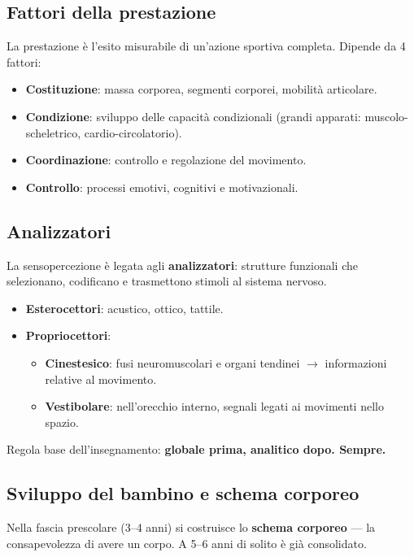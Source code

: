 \documentclass[12pt, a4paper]{article}
\begin{document}
\subsection{Fattori della prestazione}

La prestazione è l'esito misurabile di un'azione sportiva completa. Dipende da 4 fattori:
\begin{itemize}
  \item \textbf{Costituzione}: massa corporea, segmenti corporei, mobilità articolare.
  \item \textbf{Condizione}: sviluppo delle capacità condizionali (grandi apparati: muscolo-scheletrico, cardio-circolatorio).
  \item \textbf{Coordinazione}: controllo e regolazione del movimento.
  \item \textbf{Controllo}: processi emotivi, cognitivi e motivazionali.
\end{itemize}

\subsection{Analizzatori}

La sensopercezione è legata agli \textbf{analizzatori}: strutture funzionali che selezionano, codificano e trasmettono stimoli al sistema nervoso.

\begin{itemize}
  \item \textbf{Esterocettori}: acustico, ottico, tattile.
  \item \textbf{Propriocettori}:
  \begin{itemize}
    \item \textbf{Cinestesico}: fusi neuromuscolari e organi tendinei $\rightarrow$ informazioni relative al movimento.
    \item \textbf{Vestibolare}: nell'orecchio interno, segnali legati ai movimenti nello spazio.
  \end{itemize}
\end{itemize}

Regola base dell'insegnamento: \textbf{globale prima, analitico dopo. Sempre.}

\subsection{Sviluppo del bambino e schema corporeo}

Nella fascia prescolare (3--4 anni) si costruisce lo \textbf{schema corporeo} --- la consapevolezza di avere un corpo. A 5--6 anni di solito è già consolidato.
\end{document}
